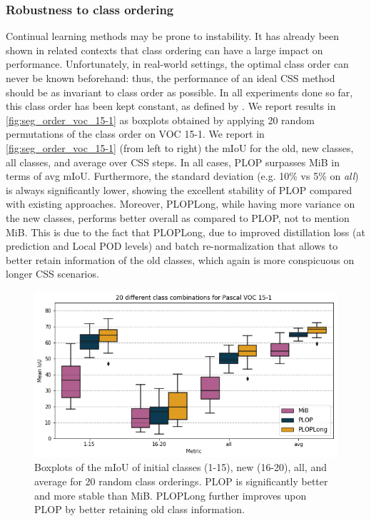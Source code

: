 \subsubsection{Robustness to class ordering}

Continual learning methods may be prone to instability. It has already been shown in related
contexts \citep{kim2019medic} that class ordering can have a large impact on performance.
Unfortunately, in real-world settings, the optimal class order can never be known beforehand: thus,
the performance of an ideal \ac{CSS} method should be as invariant to class order as possible. In all
experiments done so far, this class order has been kept constant, as defined
by \cite{cermelli2020modelingthebackground}. We report results in \autoref{fig:seg_order_voc_15-1}
as boxplots obtained by applying 20 random permutations of the class order on VOC 15-1. We report in
\autoref{fig:seg_order_voc_15-1} (from left to right) the \ac{mIoU} for the old, new classes, all
classes, and average over \ac{CSS} steps. In all cases, PLOP surpasses MiB in terms of avg \ac{mIoU}.
Furthermore, the standard deviation (e.g. 10\% vs 5\% on \textit{all}) is always significantly
lower, showing the excellent stability of PLOP compared with existing approaches. Moreover,
PLOPLong, while having more variance on the new classes, performs better overall as compared to
PLOP, not to mention MiB. This is due to the fact that PLOPLong, due to improved distillation loss
(at prediction and Local POD levels) and batch re-normalization that allows to better retain
information of the old classes, which again is more conspicuous on longer \ac{CSS} scenarios.




\begin{figure}
    \includegraphics[width=\linewidth]{images/seg/order_voc_15-1.png}
    \vspace*{-0.3cm}
    \caption{Boxplots of the \ac{mIoU} of initial classes (1-15), new (16-20), all, and average for
        20 random class orderings. PLOP is significantly better and more stable than MiB. PLOPLong
        further improves upon PLOP by better retaining old class information.}
    \label{fig:seg_order_voc_15-1}
\end{figure}


